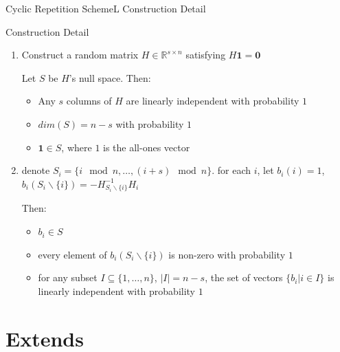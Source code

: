 \documentclass{beamer}
\begin{document}
\begin{frame}{Cyclic Repetition SchemeL Construction Detail}
    \begin{block}{Construction Detail}
        \begin{enumerate}
            \item Construct a random matrix $H \in \mathbb{R}^{s\times n}$ satisfying $H\boldsymbol{1} = \boldsymbol{0}$
            
            Let $S$ be $H$'s null space. Then:
            \begin{itemize}
                \item Any $s$ columns of $H$ are linearly independent with probability $1$
                \item $dim(S) = n - s$ with probability $1$
                \item $\boldsymbol{1}\in S$, where $1$ is the all-ones vector
            \end{itemize}
            \item denote $S_i = \{i \mod n, \dots, (i + s) \mod n\}.$ for each $i$, let $b_i(i) = 1$, $b_i(S_i \backslash \{i\}) = -H_{S_i \backslash \{i\}}^{-1}H_i$

            Then:
            \begin{itemize}
                \item $b_i\in S$
                \item every element of $b_i(S_i \backslash \{i\})$ is non-zero with probability $1$
                \item for any subset $I\subseteq \{1, \dots, n\}$, $\lvert I\rvert = n - s$, the set of vectors $\{b_i \vert i\in I\}$ is linearly independent with probability $1$
            \end{itemize}
        \end{enumerate}
    \end{block}
\end{frame}

\section{Extends}
\end{document}
